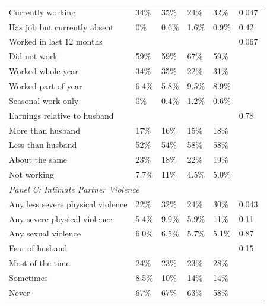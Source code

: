 \documentclass{article}
\begin{document}
\begin{landscape}
\begin{longtable}{@{}p{6cm}p{2.5cm}p{2.5cm}p{2.5cm}p{2.5cm}p{1.5cm}@{}}
\quad Currently working                      & 34\%   & 35\%   & 24\%   & 32\%   & 0.047 \\
\quad Has job but currently absent           & 0\%    & 0.6\%  & 1.6\%  & 0.9\%  & 0.42  \\
\quad Worked in last 12 months               &        &        &        &        & 0.067 \\
\quad\quad Did not work                      & 59\%   & 59\%   & 67\%   & 59\%   &       \\
\quad\quad Worked whole year                 & 34\%   & 35\%   & 22\%   & 31\%   &       \\
\quad\quad Worked part of year               & 6.4\%  & 5.8\%  & 9.5\%  & 8.9\%  &       \\
\quad\quad Seasonal work only                & 0\%    & 0.4\%  & 1.2\%  & 0.6\%  &       \\
\quad Earnings relative to husband           &        &        &        &        & 0.78  \\
\quad\quad More than husband                 & 17\%   & 16\%   & 15\%   & 18\%   &       \\
\quad\quad Less than husband                 & 52\%   & 54\%   & 58\%   & 58\%   &       \\
\quad\quad About the same                    & 23\%   & 18\%   & 22\%   & 19\%   &       \\
\quad\quad Not working                       & 7.7\%  & 11\%   & 4.5\%  & 5.0\%  &       \\[6pt]

\multicolumn{6}{l}{\textit{Panel C: Intimate Partner Violence}} \\[2pt]

\quad Any less severe physical violence      & 22\%   & 32\%   & 24\%   & 30\%   & 0.043 \\
\quad Any severe physical violence           & 5.4\%  & 9.9\%  & 5.9\%  & 11\%   & 0.11  \\
\quad Any sexual violence                    & 6.0\%  & 6.5\%  & 5.7\%  & 5.1\%  & 0.87  \\
\quad Fear of husband                        &        &        &        &        & 0.15  \\
\quad\quad Most of the time                  & 24\%   & 23\%   & 23\%   & 28\%   &       \\
\quad\quad Sometimes                         & 8.5\%  & 10\%   & 14\%   & 14\%   &       \\
\quad\quad Never                             & 67\%   & 67\%   & 63\%   & 58\%   &       \\[6pt]


\end{longtable}
\end{landscape}
\end{document}
